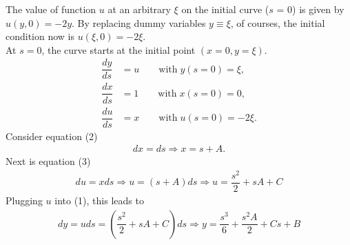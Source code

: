 \documentclass{article}
\newcommand{\f}[2]{\dfrac{#1}{#2}}
\newcommand{\at}[2]{\bigg\rvert_{#1}^{#2} }
\begin{document}
%
The value of function $u$ at an arbitrary $\xi$ on the initial curve ($s$ = 0) is given by $u(y,0) = -2y$. By replacing dummy variables $y \equiv \xi$, of courses, the initial condition now is $u(\xi,0) = -2\xi$.\\
At $s = 0$, the curve starts at the initial point $(x = 0 , y = \xi)$.
\begin{align*}
	\f{dy}{ds} & = u  \quad\quad \text{with} \; y(s = 0) = \xi, \tag{1}   \\
	\f{dx}{ds} & = 1  \quad\quad \text{with} \; x(s = 0) = 0, \tag{2}     \\
	\f{du}{ds} & = x  \quad\quad \text{with} \; u(s = 0) = -2\xi. \tag{3}
\end{align*}
Consider equation (2)
\begin{align*}
	dx = ds \Rightarrow x = s + A .\tag{4}
\end{align*}
Next is equation (3)
\begin{align*}
	du = x ds \Rightarrow u = (s + A) ds \Rightarrow u = \f{s^{2}}{2} + s A + C \tag{5}
\end{align*}
Plugging $u$ into (1), this leads to
\begin{align*}
	dy = u ds = \left(\f{s^{2}}{2} + s A + C\right) ds \Rightarrow y = \f{s^{3}}{6} + \f{s^{2}A}{2} + C s +  B \tag{6}
\end{align*}
\end{document}
